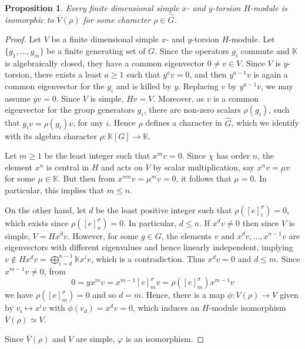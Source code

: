 \documentclass[11pt, twoside]{amsart}
\newtheorem{proposition}[theorem]{Proposition}
\theoremstyle{definition}
\newcommand{\KK}{\mathbb{K}}
\newcommand{\wind}[2]{[#1]_{#2}^{\sigma}}
\begin{document}
\begin{proposition}
Every finite dimensional simple $x$- and $y$-torsion $H$-module is isomorphic to $\overline{V}(\rho)$ for some character $\rho\in \widehat{G}$.
\end{proposition}

\begin{proof}
Let $V$ be a finite dimensional simple $x$- and $y$-torsion $H$-module. Let $\{g_1,\ldots, g_m\}$ be a finite generating set of $G$.
Since the operators $g_i$ commute and $\KK$ is algebraically closed, they have
a common eigenvector $0\neq v\in V$. Since $V$ is $y$-torsion, there exists a least
$a\ge 1$ such that $y^a v=0$, and then $y^{a-1}v$ is again a common eigenvector for the
$g_i$ and is killed by $y$. Replacing $v$ by $y^{a-1}v$, we may assume $yv=0$.
Since $V$ is simple, $Hv=V$. Moreover, as $v$ is a common eigenvector for the group generators $g_i$, there are non-zero scalars $\rho(g_i)$, such that $g_iv = \rho(g_i)v$, for any $i$. Hence $\rho$ defines a character in $\widehat{G}$, which we identify with its algebra character $\rho:\KK[G]\to\KK$. 


Let $m\geq 1$ be the least integer such that $x^mv = 0$. Since $\chi$ has order $n$, the element $x^{n}$ is central in $H$ and acts on $V$ by scalar multiplication, say $x^{n}v = \mu v$ for some $\mu \in \mathbb{K}$. But then from $x^{nm}v = \mu^{m}v = 0$, it follows that $\mu = 0$. In particular, this implies that $m \leq n$. 

On the other hand, let $d$ be the least positive integer such that $\rho([e]_{i}^{\sigma})=0$, which exists since $\rho([e]_{n}^{\sigma}) = 0$. In particular, $d \leq n$. 
If $x^{d}v \neq  0$ then since $V$ is simple,  $V = Hx^{d}v$. However, for some $g \in G$, the elements $v$ and $x^{d} v, \ldots, x^{n-1} v$ are eigenvectors with different eigenvalues and hence linearly independent, implying $v \not\in H x^{d} v = \bigoplus_{i=d}^{n-1} \KK x^iv$, which is a contradiction. Thus $x^dv=0$ and $d\leq m$. Since $x^{m - 1}v \neq 0$, from 
%
\[
0 = y x^{m} v = x^{m-1} [e]_{m}^\sigma v = \rho([e]_{m}^\sigma) x^{m-1} v
\]
we have $\rho([e]_{m}^{\sigma}) = 0$ and so $d = m$.  Hence, there is a map $\phi: V(\rho) \to V$ given by $v_i \mapsto x^i v$ with  $\phi(v_d) = x^dv=0$, which induces an $H$-module isomorphism $\overline{V}(\rho) \simeq V$. 

Since $\overline{V}(\rho)$ and $V$ are simple, $\varphi$ is an isomorphism.
\end{proof}
\end{document}
